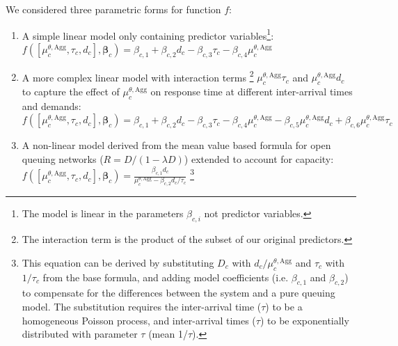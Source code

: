 We considered three parametric forms for function $f$: 
\begin{enumerate}
\item A simple linear model only containing predictor variables\footnote{The model is linear in the parameters $\beta_{c,i}$ not predictor variables.}:\\
$f(\left[\mu^{\theta,\text{Agg}}_{c},\tau_{c},d_{c}\right],\boldsymbol\beta_{c}) = \beta_{c,1} +  \beta_{c,2} d_c - \beta_{c,3} {\tau}_c - \beta_{c,4} \mu^{\theta,\text{Agg}}_c$
\item A more complex linear model with interaction terms \footnote{The interaction term is the product of the subset of our original predictors.} $\mu^{\theta,\text{Agg}}_c \tau_c$ and $\mu^{\theta,\text{Agg}}_c d_c$ to capture the effect of $\mu^{\theta,\text{Agg}}_c$ on response time at different inter-arrival times and demands:\\
$f(\left[\mu^{\theta,\text{Agg}}_{c},\tau_{c},d_{c}\right],\boldsymbol\beta_{c}) = \beta_{c,1} + \beta_{c,2} d_c-\beta_{c,3} {\tau}_c-\beta_{c,4} \mu^{\theta,\text{Agg}}_c-\beta_{c,5} \mu^{\theta,\text{Agg}}_c d_c + \beta_{c,6} \mu^{\theta,\text{Agg}}_c {\tau}_c$
\item  A non-linear model derived from the mean value based formula for open queuing networks ($R=D/(1-\lambda D)$) \cite{lazowska_quantitative_1984} extended to account for capacity:\\
$f(\left[\mu^{\theta,\text{Agg}}_{c},\tau_{c},d_{c}\right],\boldsymbol\beta_{c})=\frac{\beta_{c,1} d_c}{\mu^{\theta,\text{Agg}}_c-\beta_{c,2} d_c/{\tau}_c}$ 
\footnote{This equation can be derived by substituting $D_c$ with
  $d_c/\mu^{\theta,\text{Agg}}_c$ and ${\tau}_c$ with $1/{\tau}_c$ from the base formula, and adding model coefficients (i.e. $\beta_{c,1}$ and
  $\beta_{c,2}$) to compensate for the differences between the system and a pure queuing model. The substitution requires the inter-arrival time
  ($\tau $) to be a homogeneous Poisson process, and inter-arrival
  times ($\tau $) to be exponentially distributed with parameter
  $\tau $ (mean 1/$\tau $).}
\end{enumerate}

